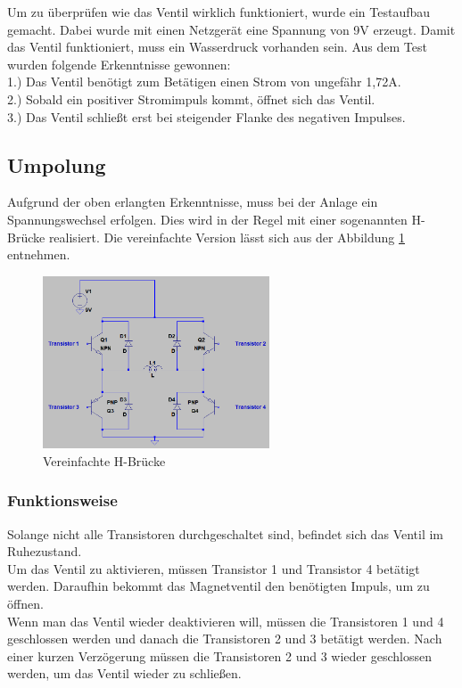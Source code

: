 Um zu überprüfen wie das Ventil wirklich funktioniert, wurde ein Testaufbau gemacht. Dabei wurde mit einen Netzgerät eine Spannung von 9V erzeugt. Damit das Ventil funktioniert, muss ein Wasserdruck vorhanden sein. Aus dem Test wurden folgende Erkenntnisse gewonnen: \\

1.) Das Ventil benötigt zum Betätigen einen Strom von ungefähr 1,72A. \\

2.) Sobald ein positiver Stromimpuls kommt, öffnet sich das Ventil.\\

3.) Das Ventil schließt erst bei steigender Flanke des negativen Impulses.

\subsection{Umpolung}
\label{sec:umpolung}

Aufgrund der oben erlangten Erkenntnisse, muss bei der Anlage ein Spannungswechsel erfolgen. Dies wird in der Regel mit einer sogenannten H-Brücke realisiert. Die vereinfachte Version lässt sich aus der Abbildung \ref{fig:hbruecke} entnehmen. 

\begin{figure}[H]
\begin{center}
	\includegraphics[width=0.6\textwidth]{fig/HBruecke}
	\caption{Vereinfachte H-Brücke \label{fig:hbruecke}}
\end{center}
\end{figure}

\subsubsection{Funktionsweise}
\label{sec:funktionsweise}

Solange nicht alle Transistoren durchgeschaltet sind, befindet sich das Ventil im Ruhezustand. \\
Um das Ventil zu aktivieren, müssen Transistor 1 und Transistor 4 betätigt werden. Daraufhin bekommt das Magnetventil den benötigten Impuls, um zu öffnen.\\
Wenn man das Ventil wieder deaktivieren will, müssen die Transistoren 1 und 4 geschlossen werden und danach die Transistoren 2 und 3 betätigt werden. Nach einer kurzen Verzögerung müssen die Transistoren 2 und 3 wieder geschlossen werden, um das Ventil wieder zu schließen.

